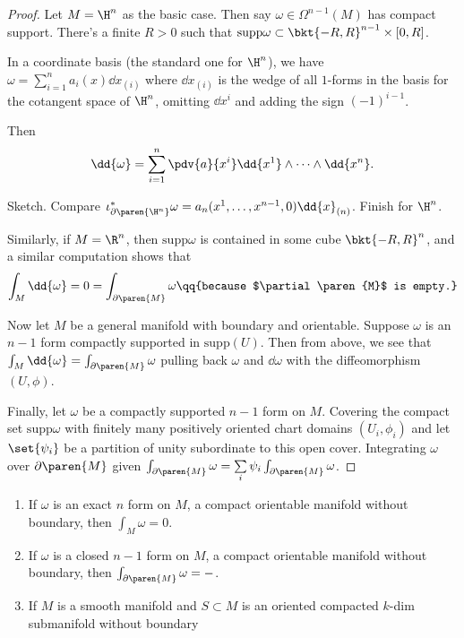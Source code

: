\begin{proof}
    Let $M = \H^n$ as the basic case. Then say $\omega \in \Omega^{n-1}(M)$ has compact support. There's a finite $R > 0$ such that $\mathrm{supp}\omega \subset \bkt{-R, R}^{n-1} \times [0, R]$.

    In a coordinate basis (the standard one for $\H^n$), we have $\omega = \sum\limits_{i=1}^{n}a_i(x) \dd{x}_{(i)}$ where $\dd{x}_{(i)}$ is the wedge of all $1$-forms in the basis for the cotangent space of $\H^n$, omitting $\dd{x^i}$ and adding the sign $(-1)^{i-1}$.

Then 
\begin{equation*}
    \dd{\omega} = \sum\limits_{i=1}^{n} \pdv{a}{x^i} \dd{x^1} \wedge \cdots \wedge \dd{x^n}.
\end{equation*}

    Sketch. Compare $\iota^*_{\partial\paren{\H^n}}\omega = a_n(x^1, \ldots, x^{n-1}, 0) \dd{x}_{(n)}$. Finish for $\H^n$.

    Similarly, if $M = \R^n$, then $\mathrm{supp} \omega$ is contained in some cube $\bkt{-R,R}^n$, and a similar computation shows that 
    \begin{equation*}
        \int_M \dd{\omega} = 0 = \int_{\partial\paren{M}} \omega \qq{because $\partial\paren{M}$ is empty.}
    \end{equation*}

    Now let $M$ be a general manifold with boundary and orientable. Suppose $\omega$ is an $n-1$ form compactly supported in $\mathrm{supp}(U)$. Then from above, we see that $\int_M \dd{\omega} = \int_{\partial\paren{M}} \omega$ pulling back $\omega$ and $\dd{\omega}$ with the diffeomorphism $(U, \phi)$.

    Finally, let $\omega$ be a compactly supported $n-1$ form on $M$. Covering the compact set $\mathrm{supp} \omega$ with finitely many positively oriented chart domains $(U_i, \phi_i)$ and let $\set{\psi_i}$ be a partition of unity subordinate to this open cover. 
    Integrating $\omega$ over $\partial\paren{M}$ given $\int_{\partial\paren{M}}\omega = \sum\limits_{i} \psi_i \int_{\partial\paren{M}}\omega$.
\end{proof}

\begin{coro}
    \label{coro:exact_and_closed_forms}
    \hfill
    \begin{enumerate}
        \item   If $\omega$ is an exact $n$ form on $M$, a compact orientable manifold without boundary, then $\int_M \omega = 0$.
        \item   If $\omega$ is a closed $n-1$ form on $M$, a compact orientable manifold without boundary, then $\int_{\partial\paren{M}} \omega = -$.
            \item If $M$ is a smooth manifold and $S \subset M$ is an oriented compacted $k$-dim submanifold without boundary \TODO
    \end{enumerate}
\end{coro}
